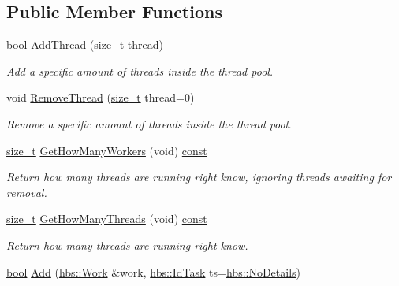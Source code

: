 \subsection*{Public Member Functions}
\begin{DoxyCompactItemize}
\item 
\hyperlink{term__entry_8h_a002004ba5d663f149f6c38064926abac}{bool} \hyperlink{classhbs_1_1_workers_abcecaa0389dfaef7bba2d0ed49d3387d}{Add\-Thread} (\hyperlink{nc__alloc_8h_a7b60c5629e55e8ec87a4547dd4abced4}{size\-\_\-t} thread)
\begin{DoxyCompactList}\small\item\em Add a specific amount of threads inside the thread pool. \end{DoxyCompactList}\item 
void \hyperlink{classhbs_1_1_workers_a187412eef0f473cc77352c46212139d0}{Remove\-Thread} (\hyperlink{nc__alloc_8h_a7b60c5629e55e8ec87a4547dd4abced4}{size\-\_\-t} thread=0)
\begin{DoxyCompactList}\small\item\em Remove a specific amount of threads inside the thread pool. \end{DoxyCompactList}\item 
\hyperlink{nc__alloc_8h_a7b60c5629e55e8ec87a4547dd4abced4}{size\-\_\-t} \hyperlink{classhbs_1_1_workers_aaabd1d8fa09fd7757dad48d7b9a613cf}{Get\-How\-Many\-Workers} (void) \hyperlink{term__entry_8h_a57bd63ce7f9a353488880e3de6692d5a}{const} 
\begin{DoxyCompactList}\small\item\em Return how many threads are running right know, ignoring threads awaiting for removal. \end{DoxyCompactList}\item 
\hyperlink{nc__alloc_8h_a7b60c5629e55e8ec87a4547dd4abced4}{size\-\_\-t} \hyperlink{classhbs_1_1_workers_aa13f3e6ed55ebf0a23ead4903ca99d43}{Get\-How\-Many\-Threads} (void) \hyperlink{term__entry_8h_a57bd63ce7f9a353488880e3de6692d5a}{const} 
\begin{DoxyCompactList}\small\item\em Return how many threads are running right know. \end{DoxyCompactList}\item 
\hyperlink{term__entry_8h_a002004ba5d663f149f6c38064926abac}{bool} \hyperlink{classhbs_1_1_workers_ae7ee79b106483cd7bb2eb2c4158c11dd}{Add} (\hyperlink{classhbs_1_1_work}{hbs\-::\-Work} \&work, \hyperlink{namespacehbs_aab8d06205ac2b0b14186327fd6c1c0d6}{hbs\-::\-Id\-Task} ts=\hyperlink{namespacehbs_ad95bc3c367f3d09c0d70ff80c469a15ca18ab2d1bfa3ea7aaf3a8a3272c384667}{hbs\-::\-No\-Details})

\end{DoxyCompactItemize}
